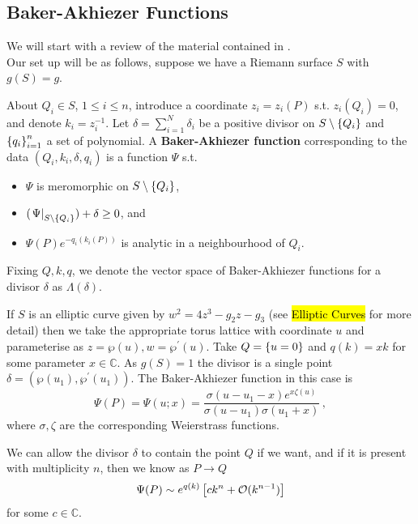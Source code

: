 \documentclass{article}
\begin{document}
\subsection{Baker-Akhiezer Functions}
We will start with a review of the material contained in \cite{Dubrovin2009, Dubrovin1985}. \\
Our set up will be as follows, suppose we have a Riemann surface $S$ with $g(S)=g$. 
\begin{definition}
	About $Q_i \in S$, $1 \leq i \leq n$, introduce a coordinate $z_i=z_i(P)$ s.t. $z_i(Q_i)=0$, and denote $k_i=z_i^{-1}$. Let $\delta = \sum_{i=1}^{N} \delta_i $ be a positive divisor on $S\setminus \left\{ Q_i \right\}$ and $\left\{ q_i \right\}_{i=1}^n$ a set of  polynomial. A \textbf{Baker-Akhiezer function} corresponding to the data $(Q_i,k_i,\delta,q_i)$ is a function $\Psi$ s.t. 
	\begin{itemize}
		\item $\Psi$ is meromorphic on $S \setminus \left\{ Q_i \right\}$, 
		\item $(\left. \Psi \right\rvert_{S\setminus \left\{ Q_i \right\}})+\delta \geq 0$, and 
		\item $\Psi(P)e^{-q_i(k_i(P))}$ is analytic in a neighbourhood of $Q_i$. 
	\end{itemize}
	Fixing $Q,k,q$, we denote the vector space of Baker-Akhiezer functions for a divisor $\delta$ as $\Lambda(\delta)$. 
\end{definition}

\begin{example}
	If $S$ is an elliptic curve given by $w^2=4z^3-g_2z-g_3$ (see \hl{Elliptic Curves} for more detail) then we take the appropriate torus lattice with coordinate $u$ and parameterise as $z=\wp(u), w=\wp^\prime(u)$. Take $Q = \left\{ u=0 \right\}$ and $q(k)=xk$ for some parameter $x \in \mathbb{C}$. As $g(S)=1$ the divisor is a single point $\delta=(\wp(u_1),\wp^\prime(u_1))$. The Baker-Akhiezer function in this case is 
	\[
	\Psi(P) = \Psi(u;x) = \frac{\sigma(u-u_1-x)e^{x\zeta(u)}}{\sigma(u-u_1)\sigma(u_1+x)} \, ,
	\]
	where $\sigma, \zeta$ are the corresponding Weierstrass functions. 
\end{example}

\begin{remark}
	We can allow the divisor $\delta$ to contain the point $Q$ if we want, and if it is present with multiplicity $n$, then we know as $P\to Q$ 
	\[
	\Psi(P) \sim e^{q(k)}\left[ ck^n + \mathcal{O}(k^{n-1}) \right]
	\]
	for some $c \in \mathbb{C}$. 
\end{remark}
\end{document}
